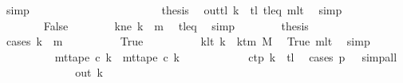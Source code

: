 \begin{isabellebody}
\ simp\isanewline
\ \ \ \ \ \ \ \ \isamarkupfalse%
\isanewline
\ \ \ \ \ \ \isamarkupfalse%
\isanewline
\ \ \ \ \ \ \isamarkupfalse%
\ {\isacharquery}{\kern0pt}thesis\ \isamarkupfalse%
\ out{\isacharunderscore}{\kern0pt}tl\ {\isacartoucheopen}k\ {\isacharequal}{\kern0pt}\ {\isacharquery}{\kern0pt}tl{\isacartoucheclose}\ tl{\isacharunderscore}{\kern0pt}eq\ m{}lt\ \isamarkupfalse%
\ simp\isanewline
\ \ \ \ \isamarkupfalse%
\isanewline
\ \ \ \ \ \ \isamarkupfalse%
\ False\isanewline
\ \ \ \ \ \ \isamarkupfalse%
\ kne{\isacharcolon}{\kern0pt}\ {\isachardoublequoteopen}k\ {\isasymnoteq}\ {\isacharquery}{\kern0pt}m{}{\isachardoublequoteclose}\ \isamarkupfalse%
\ tl{\isacharunderscore}{\kern0pt}eq\ \isamarkupfalse%
\ simp\isanewline
\ \ \ \ \ \ \isamarkupfalse%
\ {\isacharquery}{\kern0pt}thesis\isanewline
\ \ \ \ \ \ \isamarkupfalse%
\ {\isacharparenleft}{\kern0pt}cases\ {\isachardoublequoteopen}k\ {\isacharless}{\kern0pt}\ {\isacharquery}{\kern0pt}m{}{\isachardoublequoteclose}{\isacharparenright}{\kern0pt}\isanewline
\ \ \ \ \ \ \ \ \isamarkupfalse%
\ True\isanewline
\ \ \ \ \ \ \ \ \isamarkupfalse%
\ klt{\isacharcolon}{\kern0pt}\ {\isachardoublequoteopen}k\ {\isacharless}{\kern0pt}\ k{\isacharunderscore}{\kern0pt}tm\ M{\isachardoublequoteclose}\ \isamarkupfalse%
\ True\ m{}lt\ \isamarkupfalse%
\ simp\isanewline
\ \ \ \ \ \ \ \ \isamarkupfalse%
\ {\isachardoublequoteopen}mt{\isacharunderscore}{\kern0pt}tape\ c{}\ k\ {\isacharequal}{\kern0pt}\ mt{\isacharunderscore}{\kern0pt}tape\ c{}\ k{\isachardoublequoteclose}\isanewline
\ \ \ \ \ \ \ \ \ \ \isamarkupfalse%
\ c{}{\isacharunderscore}{\kern0pt}tp\ {\isacartoucheopen}k\ {\isasymnoteq}\ {\isacharquery}{\kern0pt}tl{\isacartoucheclose}\ \isamarkupfalse%
\ {\isacharparenleft}{\kern0pt}cases\ {\isachardoublequoteopen}{\isacharquery}{\kern0pt}p\ {\isacharequal}{\kern0pt}\ {}{\isachardoublequoteclose}{\isacharparenright}{\kern0pt}\ simp{\isacharunderscore}{\kern0pt}all\isanewline
\ \ \ \ \ \ \ \ \isamarkupfalse%
\ \isamarkupfalse%
\ {\isachardoublequoteopen}{\isasymdots}\ {\isacharequal}{\kern0pt}\ {\isacharquery}{\kern0pt}out\ k{\isachardoublequoteclose}\ \isamarkupfalse%

\end{isabellebody}
